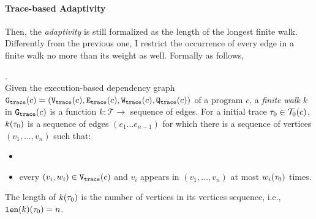 \paragraph{Trace-based Adaptivity}
Then, the \emph{adaptivity} is still formalized as the 
length of the longest finite walk. 
Differently from the previous one, I restrict 
the occurrence of every edge in a finite walk no more than its weight as well. Formally as follows,
\begin{defn}.
  \label{def:finitewalk}
  \\
  Given the execution-based dependency graph $\mathtt{{G_{trace}}}({c}) = (\mathtt{{V_{trace}}}({c}), \mathtt{{E_{trace}}}({c}), \mathtt{{W_{trace}}}({c}), \mathtt{{Q_{trace}}}({c}))$ of a program $c$,
  a \emph{finite walk} $k$ in $\mathtt{{G_{trace}}}({c})$ is a 
  function $k: \mathcal{T} \to $ sequence of edges.
  For a initial trace $\mathtt{\tau}_0 \in \mathcal{T}_0(c)$, 
  $k(\mathtt{\tau}_0)$ is a sequence of edges $(e_1 \ldots e_{n - 1})$ 
  for which there is a sequence of vertices 
  $(v_1, \ldots, v_{n})$ such that:
  \begin{itemize}
      \item {}
      \item every $(v_i, w_i) \in \mathtt{{V_{trace}}}(c)$
       and $v_i$ appears in $(v_1, \ldots, v_{n})$ at most 
    $w_i(\mathtt{\tau}_0)$
      times.  
  \end{itemize}
  The length of $k(\mathtt{\tau}_0)$ is the number of vertices in its vertices sequence, i.e., $\mathtt{len}(k)(\mathtt{\tau}_0) = n$.
 \end{defn}

